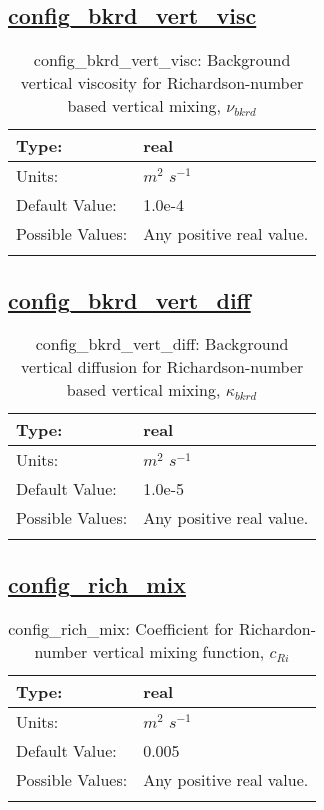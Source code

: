 \subsection[config\_bkrd\_vert\_visc]{\hyperref[sec:nm_tab_vmix_rich]{config\_bkrd\_vert\_visc}}
\label{subsec:nm_sec_config_bkrd_vert_visc}
\begin{center}
\begin{longtable}{| p{2.0in} | p{4.0in} |}
    \hline
    Type: & real \\
    \hline
    Units: & $m^2$ $s^{-1}$ \\
    \hline
    Default Value: & 1.0e-4 \\
    \hline
    Possible Values: & Any positive real value. \\
    \hline
    \caption{config\_bkrd\_vert\_visc:  Background vertical viscosity for Richardson-number based vertical mixing,  $\nu_{bkrd}$ }
\end{longtable}
\end{center}
\subsection[config\_bkrd\_vert\_diff]{\hyperref[sec:nm_tab_vmix_rich]{config\_bkrd\_vert\_diff}}
\label{subsec:nm_sec_config_bkrd_vert_diff}
\begin{center}
\begin{longtable}{| p{2.0in} | p{4.0in} |}
    \hline
    Type: & real \\
    \hline
    Units: & $m^2$ $s^{-1}$ \\
    \hline
    Default Value: & 1.0e-5 \\
    \hline
    Possible Values: & Any positive real value. \\
    \hline
    \caption{config\_bkrd\_vert\_diff:  Background vertical diffusion for Richardson-number based vertical mixing,  $\kappa_{bkrd}$ }
\end{longtable}
\end{center}
\subsection[config\_rich\_mix]{\hyperref[sec:nm_tab_vmix_rich]{config\_rich\_mix}}
\label{subsec:nm_sec_config_rich_mix}
\begin{center}
\begin{longtable}{| p{2.0in} | p{4.0in} |}
    \hline
    Type: & real \\
    \hline
    Units: & $m^2$ $s^{-1}$ \\
    \hline
    Default Value: & 0.005 \\
    \hline
    Possible Values: & Any positive real value. \\
    \hline
    \caption{config\_rich\_mix:  Coefficient for Richardon-number vertical mixing function,  $c_{Ri}$ }
\end{longtable}
\end{center}
